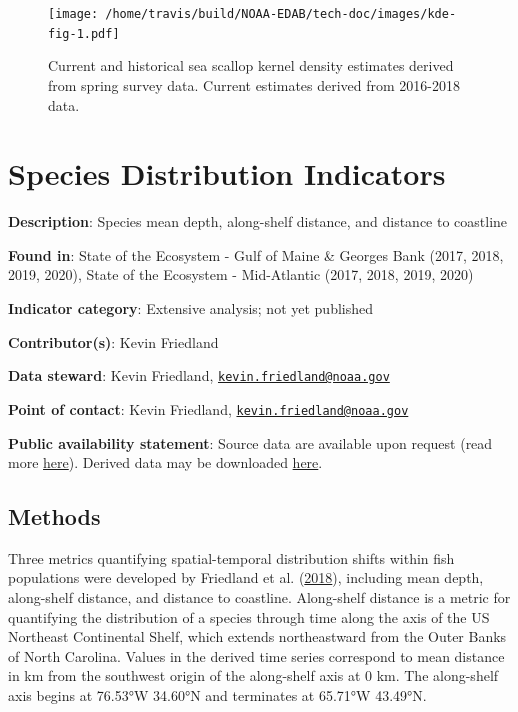 \documentclass[
]{book}
\begin{document}
\begin{figure}
\centering
\texttt{[image: /home/travis/build/NOAA-EDAB/tech-doc/images/kde-fig-1.pdf]}
\caption{\label{fig:kde-fig}Current and historical sea scallop kernel density estimates derived from spring survey data. Current estimates derived from 2016-2018 data.}
\end{figure}

\hypertarget{species-distribution-indicators}{%
\chapter{Species Distribution Indicators}\label{species-distribution-indicators}}

\textbf{Description}: Species mean depth, along-shelf distance, and distance to coastline

\textbf{Found in}: State of the Ecosystem - Gulf of Maine \& Georges Bank (2017, 2018, 2019, 2020), State of the Ecosystem - Mid-Atlantic (2017, 2018, 2019, 2020)

\textbf{Indicator category}: Extensive analysis; not yet published

\textbf{Contributor(s)}: Kevin Friedland

\textbf{Data steward}: Kevin Friedland, \href{mailto:kevin.friedland@noaa.gov}{\nolinkurl{kevin.friedland@noaa.gov}}

\textbf{Point of contact}: Kevin Friedland, \href{mailto:kevin.friedland@noaa.gov}{\nolinkurl{kevin.friedland@noaa.gov}}

\textbf{Public availability statement}: Source data are available upon request (read more \href{https://inport.nmfs.noaa.gov/inport/item/22560}{here}). Derived data may be downloaded \href{https://comet.nefsc.noaa.gov/erddap/tabledap/SOE_habitat_soe_v1.html}{here}.

\hypertarget{methods-38}{%
\section{Methods}\label{methods-38}}

Three metrics quantifying spatial-temporal distribution shifts within fish populations were developed by Friedland et al. (\protect\hyperlink{ref-Friedland2018}{2018}), including mean depth, along-shelf distance, and distance to coastline. Along-shelf distance is a metric for quantifying the distribution of a species through time along the axis of the US Northeast Continental Shelf, which extends northeastward from the Outer Banks of North Carolina. Values in the derived time series correspond to mean distance in km from the southwest origin of the along-shelf axis at 0 km. The along-shelf axis begins at 76.53°W 34.60°N and terminates at 65.71°W 43.49°N.
\end{document}
